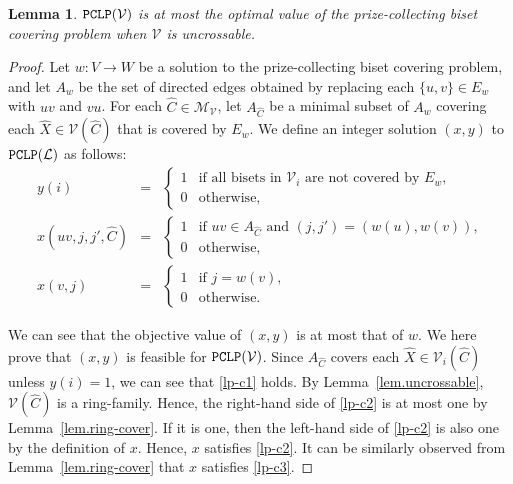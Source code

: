 \documentclass[11pt]{article}
\newtheorem{lemma}{Lemma}
\newcommand{\Mfam}{\mathcal{M}}
\newcommand{\Vfam}{\mathcal{V}}
\newcommand{\Lfam}{\mathcal{L}}
\newcommand{\LP}{{\tt PCLP}}
\begin{document}
\begin{lemma}\label{lem.relaxation}
 $\LP(\Vfam)$ is at most the optimal value of the prize-collecting
 biset covering problem when $\Vfam$ is uncrossable.
 \end{lemma}
\begin{proof}
 Let $w\colon V \rightarrow W$ be a solution to the prize-collecting
 biset covering problem, and 
 let $A_w$ be the set of directed edges obtained by replacing each
 $\{u,v\}\in E_w$ with $uv$ and $vu$.
 For each $\hat{C} \in \Mfam_{\Vfam}$,
 let $A_{\hat{C}}$ be a minimal subset of $A_w$
 covering each $\hat{X} \in \Vfam(\hat{C})$ that is covered by $E_w$.
 We define an integer solution $(x,y)$ to $\LP(\Lfam)$ as follows:
 \begin{eqnarray*}
 y(i) &=& \begin{cases}
	1 & \mbox{if all bisets in $\Vfam_i$ are not covered by $E_w$,}\\
	0 & \mbox{otherwise,}
       \end{cases}\\
 x(uv,j,j',\hat{C})&=&
 \begin{cases}
	1 & \mbox{if $uv \in A_{\hat{C}}$ and $(j,j')=(w(u),w(v))$,}\\
	0 & \mbox{otherwise,}
       \end{cases}\\
 x(v,j) &=& 
 \begin{cases}
	1 & \mbox{if $j=w(v)$,}\\
	0 & \mbox{otherwise.}
       \end{cases}
 \end{eqnarray*}

We can see that the objective value of $(x,y)$ is at
most that of $w$. We here prove that $(x,y)$ is
 feasible for $\LP(\Vfam)$.
 Since $A_{\hat{C}}$ covers each $\hat{X} \in \Vfam_i(\hat{C})$ unless $y(i)=1$,
 we can see that \eqref{lp-c1} holds.
 By Lemma~\ref{lem.uncrossable}, 
 $\Vfam(\hat{C})$ is a ring-family.
 Hence, the right-hand side of \eqref{lp-c2} is at most one by
 Lemma~\ref{lem.ring-cover}.
 If it is one, then the left-hand side of \eqref{lp-c2} is also one 
 by the definition of $x$. Hence, $x$ satisfies \eqref{lp-c2}.
 It can be similarly observed from Lemma~\ref{lem.ring-cover}
 that $x$ satisfies \eqref{lp-c3}.
\end{proof}
\end{document}
